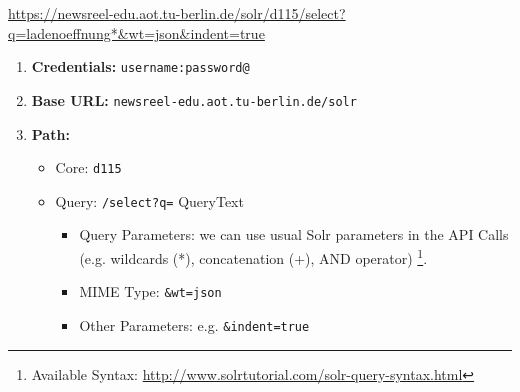 \url{https://newsreel-edu.aot.tu-berlin.de/solr/d115/select?q=ladenoeffnung*&wt=json&indent=true}
\begin{enumerate}
	\itemsep0em
	\item \textbf{Credentials: } \texttt{username:password@}
	\item \textbf{Base URL:} \texttt{newsreel-edu.aot.tu-berlin.de/solr}
	\item  \textbf{Path:}	
	\begin{itemize}
		\itemsep0em
		\item Core: \texttt{d115}
		\item Query: \texttt{/select?q=} QueryText
		\begin{itemize}
\itemsep0em
			\item Query Parameters: we can use usual Solr parameters in the API Calls (e.g. wildcards (*), concatenation (+), AND operator) \footnote{Available Syntax: \url{http://www.solrtutorial.com/solr-query-syntax.html}}.
			\item MIME Type: \texttt{&wt=json}
			\item Other Parameters: e.g. \texttt{&indent=true}
					\end{itemize}
		
	\end{itemize}
	
\end{enumerate}



%
%
%
%
%
%



%
%




%
%




